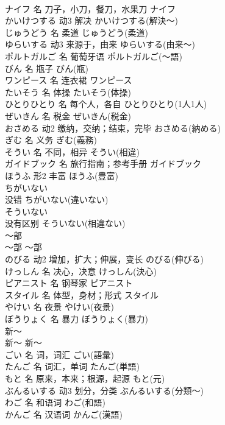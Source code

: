 \documentclass[8pt]{extreport}
\begin{document}
\begin{CJK}{UTF8}{min}
\\	ナイフ	名	刀子，小刀，餐刀，水果刀	ナイフ	
\\	かいけつする	动3	解决	かいけつする(解決～)	
\\	じゅうどう	名	柔道	じゅうどう(柔道)	
\\	ゆらいする	动3	来源于，由来	ゆらいする(由来～)	
\\	ポルトガルご	名	葡萄牙语	ポルトガルご(～語)	
\\	びん	名	瓶子	びん(瓶)	
\\	ワンピース	名	连衣裙	ワンピース	
\\	たいそう	名	体操	たいそう(体操)	
\\	ひとりひとり	名	每个人，各自	ひとりひとり(1人1人)	
\\	ぜいきん	名	税金	ぜいきん(税金)	
\\	おさめる	动2	缴纳，交纳；结束，完毕	おさめる(納める)	
\\	ぎむ	名	义务	ぎむ(義務)	
\\	そうい	名	不同，相异	そうい(相違)	
\\	ガイドブック	名	旅行指南；参考手册	ガイドブック	
\\	ほうふ	形2	丰富	ほうふ(豊富)	
\\	ちがいない	
\\	没错	ちがいない(違いない)	
\\	そういない	
\\	没有区别	そういない(相違ない)	
\\	～部	
\\	～部	～部	
\\	のびる	动2	增加，扩大；伸展，变长	のびる(伸びる)	
\\	けっしん	名	决心，决意	けっしん(決心)	
\\	ピアニスト	名	钢琴家	ピアニスト	
\\	スタイル	名	体型，身材；形式	スタイル	
\\	やけい	名	夜景	やけい(夜景)	
\\	ぼうりょく	名	暴力	ぼうりょく(暴力)	
\\	新～	
\\	新～	新～	
\\	ごい	名	词，词汇	ごい(語彙)	
\\	たんご	名	词汇，单词	たんご(単語)	
\\	もと	名	原来，本来；根源，起源	もと(元)	
\\	ぶんるいする	动3	划分，分类	ぶんるいする(分類～)	
\\	わご	名	和语词	わご(和語)	
\\	かんご	名	汉语词	かんご(漢語)	

\end{CJK}
\end{document}
